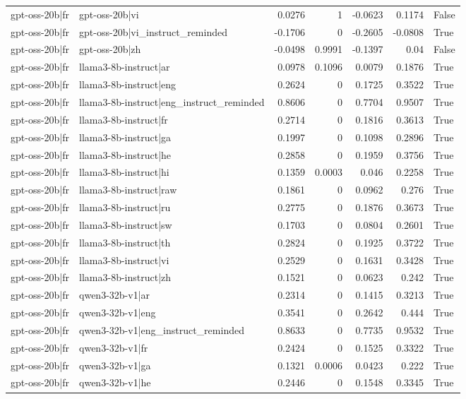 \begin{table}
\begin{tabular}{l l r r r r l}
gpt-oss-20b|fr & gpt-oss-20b|vi & 0.0276 & 1 & -0.0623 & 0.1174 & False \\
gpt-oss-20b|fr & gpt-oss-20b|vi_instruct_reminded & -0.1706 & 0 & -0.2605 & -0.0808 & True \\
gpt-oss-20b|fr & gpt-oss-20b|zh & -0.0498 & 0.9991 & -0.1397 & 0.04 & False \\
gpt-oss-20b|fr & llama3-8b-instruct|ar & 0.0978 & 0.1096 & 0.0079 & 0.1876 & True \\
gpt-oss-20b|fr & llama3-8b-instruct|eng & 0.2624 & 0 & 0.1725 & 0.3522 & True \\
gpt-oss-20b|fr & llama3-8b-instruct|eng_instruct_reminded & 0.8606 & 0 & 0.7704 & 0.9507 & True \\
gpt-oss-20b|fr & llama3-8b-instruct|fr & 0.2714 & 0 & 0.1816 & 0.3613 & True \\
gpt-oss-20b|fr & llama3-8b-instruct|ga & 0.1997 & 0 & 0.1098 & 0.2896 & True \\
gpt-oss-20b|fr & llama3-8b-instruct|he & 0.2858 & 0 & 0.1959 & 0.3756 & True \\
gpt-oss-20b|fr & llama3-8b-instruct|hi & 0.1359 & 0.0003 & 0.046 & 0.2258 & True \\
gpt-oss-20b|fr & llama3-8b-instruct|raw & 0.1861 & 0 & 0.0962 & 0.276 & True \\
gpt-oss-20b|fr & llama3-8b-instruct|ru & 0.2775 & 0 & 0.1876 & 0.3673 & True \\
gpt-oss-20b|fr & llama3-8b-instruct|sw & 0.1703 & 0 & 0.0804 & 0.2601 & True \\
gpt-oss-20b|fr & llama3-8b-instruct|th & 0.2824 & 0 & 0.1925 & 0.3722 & True \\
gpt-oss-20b|fr & llama3-8b-instruct|vi & 0.2529 & 0 & 0.1631 & 0.3428 & True \\
gpt-oss-20b|fr & llama3-8b-instruct|zh & 0.1521 & 0 & 0.0623 & 0.242 & True \\
gpt-oss-20b|fr & qwen3-32b-v1|ar & 0.2314 & 0 & 0.1415 & 0.3213 & True \\
gpt-oss-20b|fr & qwen3-32b-v1|eng & 0.3541 & 0 & 0.2642 & 0.444 & True \\
gpt-oss-20b|fr & qwen3-32b-v1|eng_instruct_reminded & 0.8633 & 0 & 0.7735 & 0.9532 & True \\
gpt-oss-20b|fr & qwen3-32b-v1|fr & 0.2424 & 0 & 0.1525 & 0.3322 & True \\
gpt-oss-20b|fr & qwen3-32b-v1|ga & 0.1321 & 0.0006 & 0.0423 & 0.222 & True \\
gpt-oss-20b|fr & qwen3-32b-v1|he & 0.2446 & 0 & 0.1548 & 0.3345 & True \\

\end{tabular}
\end{table}
